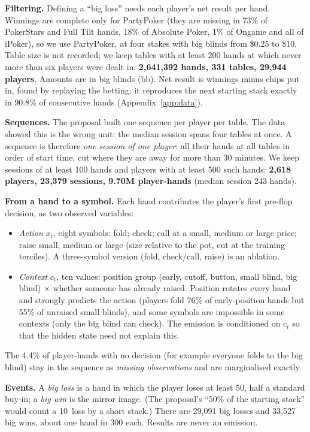 \textbf{Filtering.} Defining a ``big loss'' needs each player's net result per hand. Winnings are complete only for PartyPoker (they are missing in 73\% of PokerStars and Full Tilt hands, 18\% of Absolute Poker, 1\% of Ongame and all of iPoker), so we use PartyPoker, at four stakes with big blinds from \$0.25 to \$10. Table size is not recorded; we keep tables with at least 200 hands at which never more than six players were dealt in: \textbf{2{,}641{,}392 hands, 331 tables, 29{,}944 players}. Amounts are in big blinds (bb). Net result is winnings minus chips put in, found by replaying the betting; it reproduces the next starting stack exactly in 90.8\% of consecutive hands (Appendix~\ref{app:data}).

\textbf{Sequences.} The proposal built one sequence per player per table. The data showed this is the wrong unit: the median session spans four tables at once. A sequence is therefore \emph{one session of one player}: all their hands at all tables in order of start time, cut where they are away for more than 30 minutes. We keep sessions of at least 100 hands and players with at least 500 such hands: \textbf{2{,}618 players, 23{,}379 sessions, 9.70M player-hands} (median session 243 hands).

\textbf{From a hand to a symbol.} Each hand contributes the player's first pre-flop decision, as two observed variables:
\begin{itemize}
\item \emph{Action} $x_t$, eight symbols: fold; check; call at a small, medium or large price; raise small, medium or large (size relative to the pot, cut at the training terciles). A three-symbol version (fold, check/call, raise) is an ablation.
\item \emph{Context} $c_t$, ten values: position group (early, cutoff, button, small blind, big blind) $\times$ whether someone has already raised. Position rotates every hand and strongly predicts the action (players fold 76\% of early-position hands but 55\% of unraised small blinds), and some symbols are impossible in some contexts (only the big blind can check). The emission is conditioned on $c_t$ so that the hidden state need not explain this.
\end{itemize}
The 4.4\% of player-hands with no decision (for example everyone folds to the big blind) stay in the sequence as \emph{missing observations} and are marginalised exactly.

\textbf{Events.} A \emph{big loss} is a hand in which the player loses at least 50\bb, half a standard buy-in; a \emph{big win} is the mirror image. (The proposal's ``50\% of the starting stack'' would count a 10\bb\ loss by a short stack.) There are 29{,}091 big losses and 33{,}527 big wins, about one hand in 300 each. Results are never an emission.

